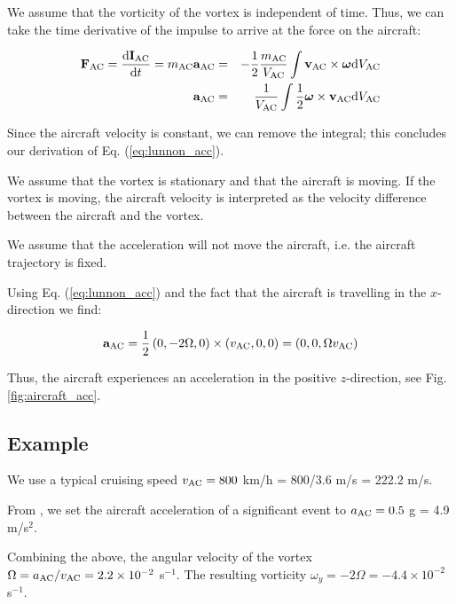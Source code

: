 \documentclass[smallextended]{svjour3}       %
\begin{document}
We assume that the vorticity of the vortex is independent of time. Thus, we can take the time derivative of the impulse to arrive at the force on the aircraft:

\begin{eqnarray}
  {\bf F_{\rm AC}} = \frac{{\rm d}{\bf I_{\rm AC}}}{{\rm d}t} = m_{\rm AC} {\bf a}_{\rm AC} &=& - \frac{1}{2} \frac{m_{\rm AC}}{V_{\rm AC}} \int {\bf v_{\rm AC}} \times \boldsymbol\omega {\rm d} V_{\rm AC} \\
  {\bf a}_{\rm AC} &=& \frac{1}{V_{\rm AC}} \int \frac{1}{2} \boldsymbol\omega \times {\bf v_{\rm AC}} {\rm d} V_{\rm AC}
\end{eqnarray}

Since the aircraft velocity is constant, we can remove the integral; this concludes our derivation of Eq. (\ref{eq:lunnon_acc}).

We assume that the vortex is stationary and that the aircraft is moving. If the vortex is moving, the aircraft velocity is interpreted as the velocity difference between the aircraft and the vortex.

We assume that the acceleration will not move the aircraft, i.e. the aircraft trajectory is fixed.

Using Eq. (\ref{eq:lunnon_acc}) and the fact that the aircraft is travelling in the $x$-direction we find:

\begin{equation}
{\bf a}_{\rm AC} = \frac{1}{2} \left(0,-2\Omega,0 \right) \times \left(v_{\rm AC},0,0\right) = \left(0,0,\Omega v_{\rm AC} \right)
\end{equation}

Thus, the aircraft experiences an acceleration in the positive $z$-direction, see Fig. \ref{fig:aircraft_acc}.

\subsection{Example}
\label{subsec:example}

We use a typical cruising speed $v_{\rm AC} = 800$ km/h = 800/3.6 m/s = 222.2 m/s.

From \citep{sharman_b}, we set the aircraft acceleration of a significant event to $a_{\rm AC} = 0.5$ g = 4.9 m/s$^2$.

Combining the above, the angular velocity of the vortex $\Omega = a_{\rm AC}/v_{\rm AC} = 2.2 \times 10^{-2}$ s$^{-1}$. The resulting vorticity $\omega_y = -2\Omega = -4.4 \times 10^{-2}$ s$^{-1}$.
\end{document}
